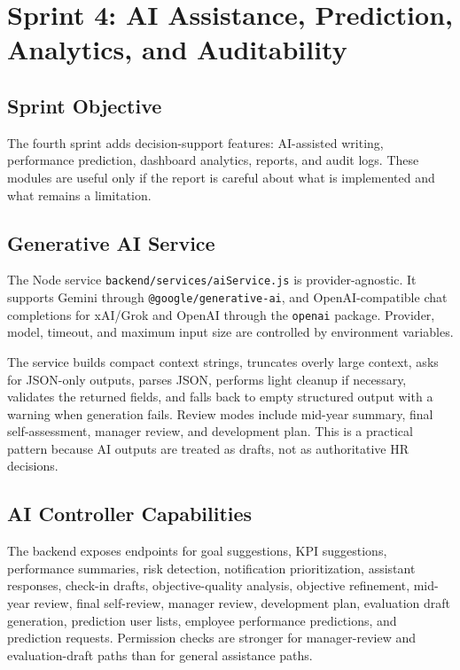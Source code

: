 \chapter{Sprint 4: AI Assistance, Prediction, Analytics, and Auditability}
\section{Sprint Objective}
The fourth sprint adds decision-support features: AI-assisted writing, performance prediction, dashboard analytics, reports, and audit logs. These modules are useful only if the report is careful about what is implemented and what remains a limitation.

\section{Generative AI Service}
The Node service \texttt{backend/services/aiService.js} is provider-agnostic. It supports Gemini through \texttt{@google/generative-ai}, and OpenAI-compatible chat completions for xAI/Grok and OpenAI through the \texttt{openai} package. Provider, model, timeout, and maximum input size are controlled by environment variables.

The service builds compact context strings, truncates overly large context, asks for JSON-only outputs, parses JSON, performs light cleanup if necessary, validates the returned fields, and falls back to empty structured output with a warning when generation fails. Review modes include mid-year summary, final self-assessment, manager review, and development plan. This is a practical pattern because AI outputs are treated as drafts, not as authoritative HR decisions.

\section{AI Controller Capabilities}
The backend exposes endpoints for goal suggestions, KPI suggestions, performance summaries, risk detection, notification prioritization, assistant responses, check-in drafts, objective-quality analysis, objective refinement, mid-year review, final self-review, manager review, development plan, evaluation draft generation, prediction user lists, employee performance predictions, and prediction requests. Permission checks are stronger for manager-review and evaluation-draft paths than for general assistance paths.




